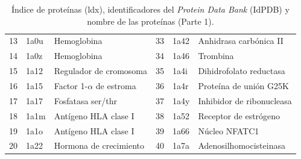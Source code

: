 \begin{table}[H]
\begin{footnotesize}
\begin{tabular}{||l|ll||l|ll||}
 				13  & 1a0u  & Hemoglobina                  & 33 & 1a42  & Anhidrasa carbónica II        \\
 				14  & 1a0z  & Hemoglobina                  & 34 & 1a46  & Trombina                      \\
 				15  & 1a12  & Regulador de cromosoma       & 35 & 1a4i  & Dihidrofolato reductasa       \\
 				16  & 1a15  & Factor 1-$\alpha$ de estroma & 36 & 1a4r  & Proteína de unión G25K        \\
 				17  & 1a17  & Fosfatasa ser/thr            & 37 & 1a4y  & Inhibidor de ribonucleasa     \\
 				18  & 1a1m  & Antígeno  HLA clase I        & 38 & 1a52  & Receptor de estrógeno         \\
 				19  & 1a1o  & Antígeno  HLA clase I        & 39 & 1a66  & Núcleo NFATC1                 \\
 				20  & 1a22  & Hormona de crecimiento       & 40 & 1a7a  & Adenosilhomocisteinasa        \\ \hline
 			\end{tabular}
 		\end{footnotesize}
 		\caption{Índice de proteínas (ldx), identificadores del \emph{Protein Data Bank} (IdPDB) y nombre de las proteínas (Parte 1).}
 		\label{Tabla:ids79(1)}
 	\end{table}
 	
